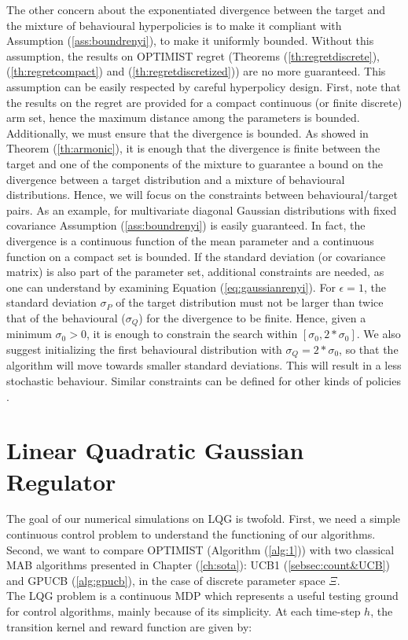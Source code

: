 The other concern about the exponentiated \Renyi divergence between the target and the mixture of behavioural hyperpolicies is to make it compliant with Assumption (\ref{ass:boundrenyi}), \ie to make it uniformly bounded. Without this assumption, the results on \gls{OPTIMIST} regret (Theorems (\ref{th:regretdiscrete}),(\ref{th:regretcompact}) and (\ref{th:regretdiscretized})) are no more guaranteed. This assumption can be easily respected by careful hyperpolicy design. First, note that the results on the regret are provided for a compact continuous (or finite discrete) arm set, hence the maximum distance among the parameters is bounded. Additionally, we must ensure that the \Renyi divergence is bounded. As showed in Theorem (\ref{th:armonic}), it is enough that the divergence is finite between the target and one of the components of the mixture to guarantee a bound on the divergence between a target distribution and a mixture of behavioural distributions. Hence, we will focus on the constraints between behavioural/target pairs. As an example, for multivariate diagonal Gaussian distributions with fixed covariance Assumption (\ref{ass:boundrenyi}) is easily guaranteed. In fact, the \Renyi divergence is a continuous function of the mean parameter \cite{gil2013renyi} and a continuous function on a compact set is bounded. If the standard deviation (or covariance matrix) is also part of the parameter set, additional constraints are needed, as one can understand by examining Equation (\ref{eq:gaussianrenyi}). For $\epsilon=1$, the standard deviation $\sigma_P$ of the target distribution must not be larger than twice that of the behavioural ($\sigma_Q$) for the divergence to be finite. Hence, given a minimum $\sigma_{0} > 0$, it is enough to constrain the search within $[\sigma_0, 2*\sigma_0]$. We also suggest initializing the first behavioural distribution with $\sigma_Q=2*\sigma_0$, so that the algorithm will move towards smaller standard deviations. This will result in a less stochastic behaviour. Similar constraints can be defined for other kinds of policies \cite{gil2013renyi}. 


\section{Linear Quadratic Gaussian Regulator}
The goal of our numerical simulations on \gls{LQG} is twofold. First, we need a simple continuous control problem to understand the functioning of our algorithms. Second, we want to compare \gls{OPTIMIST} (Algorithm (\ref{alg:1})) with two classical \gls{MAB} algorithms presented in Chapter (\ref{ch:sota}): \gls{UCB}1 (\ref{sebsec:count&UCB}) and \gls{GPUCB} (\ref{alg:gpucb}), in the case of discrete parameter space $\Xi$.\\
The \gls{LQG} problem \cite{peters2008reinforcement} is a continuous \gls{MDP} which represents a useful testing ground for control algorithms, mainly because of its simplicity. At each time-step $h$, the transition kernel and reward function are given by:


